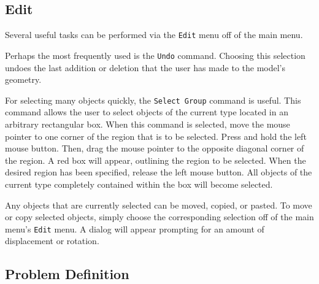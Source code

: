 \documentclass[12pt]{report}
\begin{document}
\subsection{Edit} \label{coffee}

Several useful tasks can be performed via the {\tt Edit} menu off
of the main menu.

Perhaps the most frequently used is the {\tt Undo} command.
Choosing this selection undoes the last addition or deletion that
the user has made to the model's geometry.

For selecting many objects quickly, the {\tt Select Group} command
is useful.  This command allows the user to select objects of the
current type located in an arbitrary rectangular box.  When this
command is selected, move the mouse pointer to one corner of the
region that is to be selected.  Press and hold the left mouse
button.  Then, drag the mouse pointer to the opposite diagonal
corner of the region.  A red box will appear, outlining the region
to be selected.  When the desired region has been specified,
release the left mouse button.  All objects of the current type
completely contained within the box will become selected.

Any objects that are currently selected can be moved, copied, or
pasted.  To move or copy selected objects, simply choose the
corresponding selection off of the main menu's {\tt Edit} menu. A
dialog will appear prompting for an amount of displacement or
rotation.

\subsection{Problem Definition}
\end{document}
